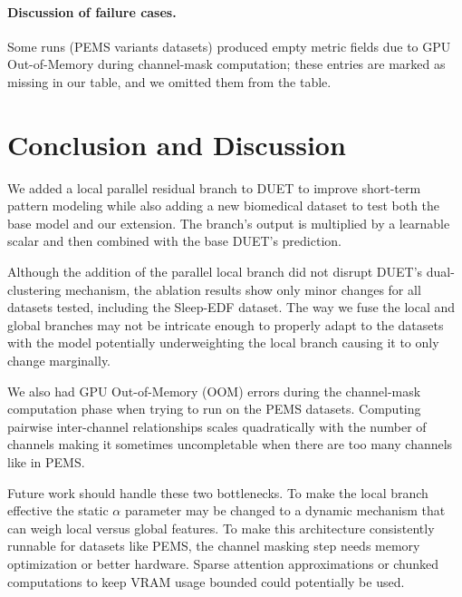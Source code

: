 \documentclass[conference]{IEEEtran}
\begin{document}
\paragraph{Discussion of failure cases.}
Some runs (PEMS variants datasets) produced empty metric fields due to GPU Out-of-Memory during channel-mask computation; these entries are marked as missing in our table, and we omitted them from the table.

\section{Conclusion and Discussion}
We added a local parallel residual branch to DUET to improve short-term pattern modeling while also adding a new biomedical dataset to test both the base model and our extension. The branch's output is multiplied by a learnable scalar and then combined with the base DUET’s prediction.

Although the addition of the parallel local branch did not disrupt DUET's dual-clustering mechanism, the ablation results show only minor changes for all datasets tested, including the Sleep-EDF dataset. The way we fuse the local and global branches may not be intricate enough to properly adapt to the datasets with the model potentially underweighting the local branch causing it to only change marginally.

We also had GPU Out-of-Memory (OOM) errors during the channel-mask computation phase when trying to run on the PEMS datasets. Computing pairwise inter-channel relationships scales quadratically with the number of channels making it sometimes uncompletable when there are too many channels like in PEMS. 

Future work should handle these two bottlenecks. To make the local branch effective the static $\alpha$ parameter may be changed to a dynamic mechanism that can weigh local versus global features. To make this architecture consistently runnable for datasets like PEMS, the channel masking step needs memory optimization or better hardware. Sparse attention approximations or chunked computations to keep VRAM usage bounded could potentially be used.



\end{document}
